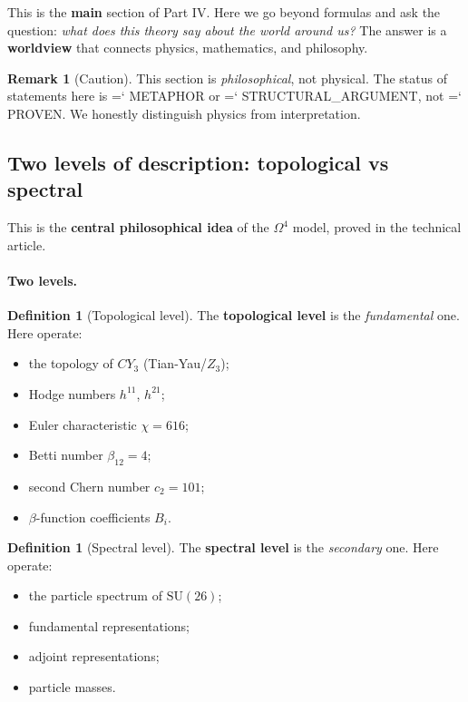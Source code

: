 \documentclass[11pt,a4paper]{article}
\newcommand{\SU}{\mathrm{SU}}
\newcommand{\CY}{CY_3}
\newcommand{\Om}{\Omega^4}
\renewcommand{\texttt}[1]{{\ttfamily\hyphenchar\font=`\- #1}}
\theoremstyle{definition}
\newtheorem{definition}[theorem]{Definition}
\newtheorem{remark}[theorem]{Remark}
\begin{document}
This is the \textbf{main} section of Part IV. Here we go 
beyond formulas and ask the question: \emph{what does this theory 
say about the world around us?} The answer is a \textbf{worldview} 
that connects physics, mathematics, and philosophy.

\begin{remark}[Caution]
\label{rem:philosophy-caution}
This section is \emph{philosophical}, not physical. The status 
of statements here is \texttt{METAPHOR} or 
\texttt{STRUCTURAL\_ARGUMENT}, not \texttt{PROVEN}. 
We honestly distinguish physics from interpretation.
\end{remark}

\subsection{Two levels of description: topological vs spectral}
\label{subsec:two-levels}

This is the \textbf{central philosophical idea} of the $\Om$ model, 
proved in the technical article.

\paragraph{Two levels.}

\begin{definition}[Topological level]
\label{def:topological-level}
The \textbf{topological level} is the \emph{fundamental} one. 
Here operate:
\begin{itemize}
    \item the topology of $\CY$ (Tian-Yau/$Z_3$);
    \item Hodge numbers $h^{11}$, $h^{21}$;
    \item Euler characteristic $\chi = 616$;
    \item Betti number $\beta_{12} = 4$;
    \item second Chern number $c_2 = 101$;
    \item $\beta$-function coefficients $B_i$.
\end{itemize}
\end{definition}

\begin{definition}[Spectral level]
\label{def:spectral-level}
The \textbf{spectral level} is the \emph{secondary} one. Here operate:
\begin{itemize}
    \item the particle spectrum of $\SU(26)$;
    \item fundamental representations;
    \item adjoint representations;
    \item particle masses.
\end{itemize}
\end{definition}
\end{document}
